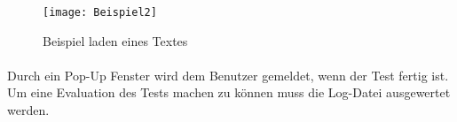 \begin{figure}[h]
  \begin{center}		%
    \texttt{[image: Beispiel2]}
  		  \caption{Beispiel laden eines Textes}
     \label{Beispielbild 2}
  \end{center}
\end{figure}

\paragraph{}
Durch ein Pop-Up Fenster wird dem Benutzer gemeldet, wenn der Test fertig ist. Um eine Evaluation des Tests machen zu können muss die Log-Datei ausgewertet werden.

